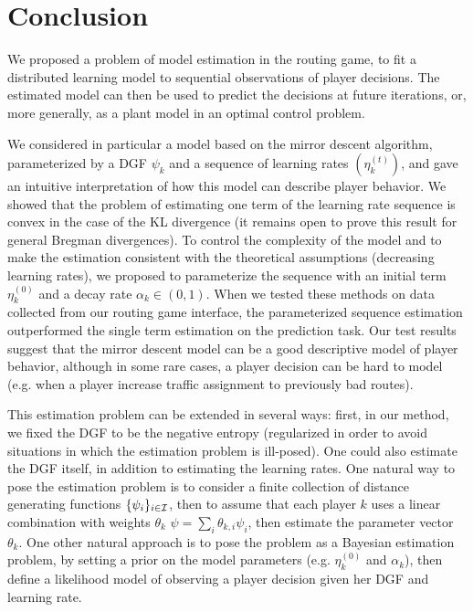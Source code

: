 \documentclass{sig-alternate-ipsn13}
\begin{document}

\section{Conclusion}
\label{sec:conclusion}
We proposed a problem of model estimation in the routing game, to fit a distributed learning model to sequential observations of player decisions. The estimated model can then be used to predict the decisions at future iterations, or, more generally, as a plant model in an optimal control problem.

We considered in particular a model based on the mirror descent algorithm, parameterized by a DGF $\psi_k$ and a sequence of learning rates $(\eta^{(t)}_k)$, and gave an intuitive interpretation of how this model can describe player behavior. We showed that the problem of estimating one term of the learning rate sequence is convex in the case of the KL divergence (it remains open to prove this result for general Bregman divergences). To control the complexity of the model and to make the estimation consistent with the theoretical assumptions (decreasing learning rates), we proposed to parameterize the sequence with an initial term $\eta_k^{(0)}$ and a decay rate $\alpha_k \in (0, 1)$. When we tested these methods on data collected from our routing game interface, the parameterized sequence estimation outperformed the single term estimation on the prediction task. Our test results suggest that the mirror descent model can be a good descriptive model of player behavior, although in some rare cases, a player decision can be hard to model (e.g. when a player increase traffic assignment to previously bad routes).

This estimation problem can be extended in several ways: first, in our method, we fixed the DGF to be the negative entropy (regularized in order to avoid situations in which the estimation problem is ill-posed). One could also estimate the DGF itself, in addition to estimating the learning rates. One natural way to pose the estimation problem is to consider a finite collection of distance generating functions $\{\psi_i\}_{i \in \mathcal{I}}$, then to assume that each player $k$ uses a linear combination with weights $\theta_k$ $\psi = \sum_{i} \theta_{k, i} \psi_i$, then estimate the parameter vector $\theta_k$. One other natural approach is to pose the problem as a Bayesian estimation problem, by setting a prior on the model parameters (e.g. $\eta^{(0)}_k$ and $\alpha_k$), then define a likelihood model of observing a player decision given her DGF and learning rate.
\end{document}
